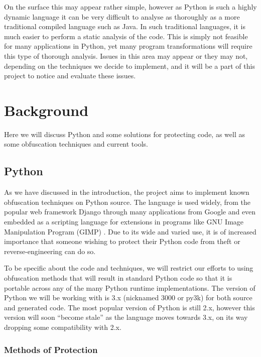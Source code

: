 \documentclass[twoside,a4paper]{report}
\begin{document}
On the surface this may appear rather simple, however as Python is such a highly dynamic language it can be very difficult to analyse
\cite[p13]{staticanal} as thoroughly as a more traditional compiled language such as Java. In such traditional languages, it is much easier to perform a static
analysis of the code. This is simply not feasible for many applications in Python, yet many program transformations will require this type of
thorough analysis. Issues in this area may appear or they may not, depending on the techniques we decide to implement, and it will be a part of
this project to notice and evaluate these issues.

\section{Background}

Here we will discuss Python and some solutions for protecting code, as well as some obfuscation techniques
and current tools.

\subsection{Python}

As we have discussed in the introduction, the project aims to implement known obfuscation techniques on Python source.
The language is used widely, from the popular web framework Django \cite{django} through many applications
from Google \cite{pygoogle} and even embedded as a scripting language for extensions in programs like GNU
Image Manipulation Program (GIMP) \cite{gimp}. Due to its wide and varied use, it is of increased importance
that someone wishing to protect their Python code from theft or reverse-engineering can do so.

To be specific about the code and techniques, we will restrict our efforts to using obfuscation methods that will
result in standard Python code so that it is portable across any of the many Python runtime implementations. The version
of Python we will be working with is 3.x (nicknamed 3000 or py3k) for both source and generated code. The most popular
version of Python is still 2.x, however this version will soon ``become stale'' as the language moves towards 3.x, on its way
dropping some compatibility with 2.x.

\subsubsection{Methods of Protection}
\end{document}
